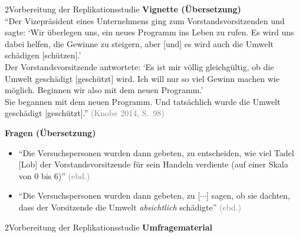 \documentclass[xcolor=table,9pt,aspectratio=169]{beamer}
\begin{document}
\begin{frame}{\vspace*{10mm}2\hspace*{1em}Vorbereitung der Replikationsstudie}
\textbf{Vignette (Übersetzung)}\\
\smallskip
\enquote{Der Vizepräsident eines Unternehmens ging zum Vorstandsvorsitzenden und sagte: \enquote{Wir überlegen uns, ein neues Programm ins Leben zu rufen. Es wird uns dabei helfen, die Gewinne zu steigern, aber \textcolor{blue2}{[und]} es wird auch die Umwelt schädigen \textcolor{blue2}{[schützen]}.}\\\vspace{0.25em}
Der Vorstandsvorsitzende antwortete: \enquote{Es ist mir völlig gleichgültig, ob die Umwelt geschädigt \textcolor{blue2}{[geschützt]} wird. Ich will nur so viel Gewinn machen wie möglich. Beginnen wir also mit dem neuen Programm.}\\\vspace{0.25em}
Sie begannen mit dem neuen Programm. Und tatsächlich wurde die Umwelt geschädigt \textcolor{blue2}{[geschützt]}.} \textcolor{gray}{(Knobe 2014, S.~98)}

\bigskip
\textbf{Fragen (Übersetzung)}\\
\begin{itemize}
   \item \enquote{Die Versuchspersonen wurden dann gebeten, zu entscheiden, wie viel Tadel \textcolor{blue2}{[Lob]} der Vorstandsvorsitzende für sein Handeln verdiente (auf einer Skala von 0 bis 6)} \textcolor{gray}{(ebd.)}
   \item \enquote{Die Versuchspersonen wurden dann gebeten, zu [$\cdots$] sagen, ob sie dachten, dass der Vorsitzende die Umwelt \textit{absichtlich} schädigte} \textcolor{gray}{(ebd.)}
\end{itemize}
\end{frame}


\begin{frame}{\vspace*{10mm}2\hspace*{1em}Vorbereitung der Replikationsstudie}
\textbf{Umfragematerial}\\
\begin{center}
   \\
\end{center}
\end{frame}
\end{document}
